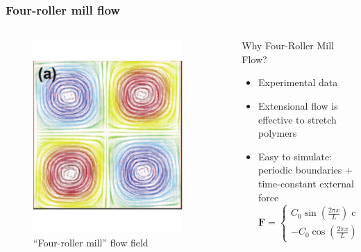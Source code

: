 \begin{frame}
  \frametitle{Four-roller mill flow}
  \begin{columns}
    \begin{column}{0.3\textwidth}
      \begin{figure}[t]
        \centering
        \includegraphics[width=0.9\textwidth]{img/4roll.pdf}
        \caption{``Four-roller mill'' flow field}
        \label{fig:snap}
      \end{figure}
    \end{column}
    \begin{column}{0.7\textwidth}
      \begin{block}{Why Four-Roller Mill Flow?}
        \begin{itemize}
        \item Experimental data
        \item Extensional flow is effective to  stretch polymers
        \item Easy to simulate: periodic boundaries + time-constant external force
          \begin{equation*}
            \mathbf{F}=\left\{\begin{matrix}
                C_0\sin(\frac{2\pi x} {L})\cos(\frac{2\pi y} {L})
                \\ 
                -C_0\cos(\frac{2\pi x} {L})\sin(\frac{2\pi y} {L})
              \end{matrix}\right.
   \end{equation*}
     \end{itemize}
      \end{block}
    \end{column}
  \end{columns}
\end{frame}

